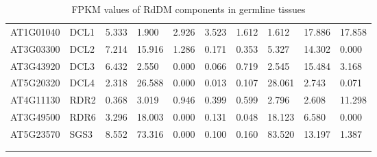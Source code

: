 \begin{landscape}
\begin{longtable}{l|l|lll|ll|lll}
AT1G01040 & DCL1     & 5.333  & 1.900   & 2.926    & 3.523  & 1.612    & 1.612   & 17.886 & 17.858   \\
AT3G03300 & DCL2     & 7.214  & 15.916  & 1.286    & 0.171  & 0.353    & 5.327   & 14.302 & 0.000    \\
AT3G43920 & DCL3     & 6.432  & 2.550   & 0.000    & 0.066  & 0.719    & 2.545   & 15.484 & 3.168    \\
AT5G20320 & DCL4     & 2.318  & 26.588  & 0.000    & 0.013  & 0.107    & 28.061  & 2.743  & 0.071    \\ \hline
AT4G11130 & RDR2     & 0.368  & 3.019   & 0.946    & 0.399  & 0.599    & 2.796   & 2.608  & 11.298   \\
AT3G49500 & RDR6     & 3.296  & 18.003  & 0.000    & 0.131  & 0.048    & 18.123  & 6.580  & 0.000    \\ \hline
AT5G23570 & SGS3     & 8.552  & 73.316  & 0.000    & 0.100  & 0.160    & 83.520  & 13.197 & 1.387  \\
\caption{FPKM values of RdDM components in germline tissues}\\
\label{tab:FPKM_germ}\\
\end{longtable}
\end{landscape}

